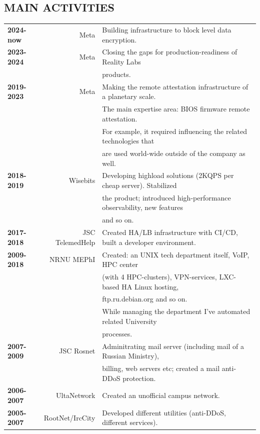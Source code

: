 \begin{resume}
\section{MAIN ACTIVITIES}
\vspace{0.1in} 
\begin{tabular}{lrl}
    {\bf 2024-now}  & Meta            & Building infrastructure to block level data encryption.\\
    {\bf 2023-2024} & Meta            & Closing the gaps for production-readiness of Reality Labs\\
                    &                 & products.\\
    {\bf 2019-2023} & Meta            & Making the remote attestation infrastructure of a planetary scale.\\
                    &                 & The main expertise area: BIOS firmware remote attestation.\\
                    &                 & For example, it required influencing the related technologies that\\
                    &                 & are used world-wide outside of the company as well.\\
    {\bf 2018-2019} & Wisebits        & Developing highload solutions (2KQPS per cheap server). Stabilized\\
                    &                 & the product; introduced high-performance observability, new features\\
                    &                 & and so on.\\
    {\bf 2017-2018} & JSC TelemedHelp & Created HA/LB infrastructure with CI/CD, built a developer environment.\\
    {\bf 2009-2018} & NRNU MEPhI      & Created: an UNIX tech department itself, VoIP, HPC center\\
                    &                 & (with 4 HPC-clusters), VPN-services, LXC-based HA Linux hosting,\\
                    &                 & ftp.ru.debian.org and so on.\\
                    &                 & While managing the department I've automated related University\\
                    &                 & processes.\\
    {\bf 2007-2009} & JSC Rosnet      & Adminitrating mail server (including mail of a Russian Ministry),\\
                    &                 & billing, web servers etc; created a mail anti-DDoS protection.\\
    {\bf 2006-2007} & UltaNetwork     & Created an unofficial campus network.\\
    {\bf 2005-2007} & RootNet/IrcCity & Developed different utilities (anti-DDoS, different services).\\
\end{tabular}
\end{resume}
